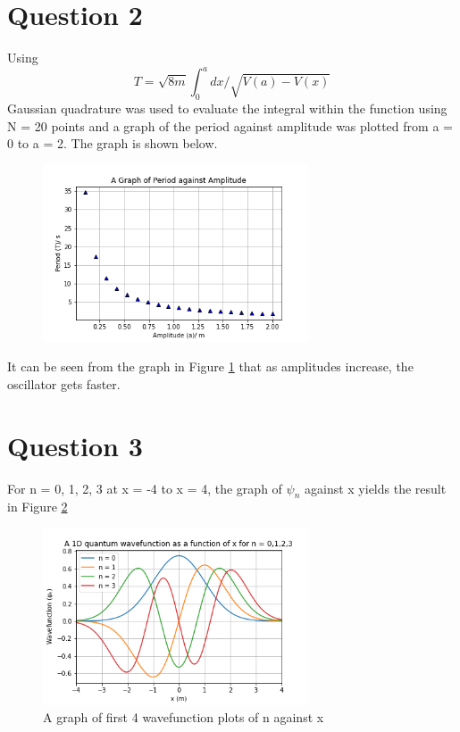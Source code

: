\documentclass[11pt]{article}
\begin{document}
\section{Question 2}
Using 
\begin{equation}
	T = \sqrt{8m}\int_{0}^{a} dx/\sqrt{V(a) - V(x)}
\end{equation}
Gaussian quadrature was used to evaluate the integral within the function using N = 20 points and a graph of the period against amplitude was plotted from a = 0 to a = 2. 
The graph is shown below.
\begin{figure}[!h]\begin{center} 
		\vspace{12pt}
		\includegraphics[width=0.7\textwidth]{anharmonic period.png}
		\label{fig:anharmonic_period} 
	\end{center}
\end{figure} 

It can be seen from the graph in Figure \ref{fig:anharmonic_period}  that as amplitudes increase, the oscillator gets faster.

\section{Question 3}

For n = 0, 1, 2, 3 at x = -4 to x = 4, the graph of $\psi_{n}$ against x yields the result in Figure \ref{fig:oscillator_multiple_n}
\begin{figure}[!h]\begin{center} 
		\vspace{12pt}
		\includegraphics[width=0.7\textwidth]{oscillator_wavefuntion_multiple_n.png} 
		\caption{A graph of first 4 wavefunction plots of n against x}
		\label{fig:oscillator_multiple_n}
	\end{center}
\end{figure}
\end{document}
